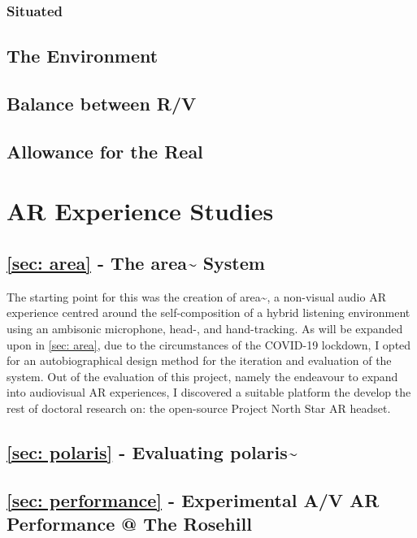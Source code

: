 \subsubsection{Situated}

\subsection{The Environment}
\subsection{Balance between R/V}
\subsection{Allowance for the Real}



\section{AR Experience Studies}
\subsection{\autoref{sec: area} -  The area\textasciitilde{} System}
The starting point for this was the creation of area\textasciitilde{}, a non-visual audio AR experience centred around the self-composition of a hybrid listening environment using an ambisonic microphone, head-, and hand-tracking. As will be expanded upon in \autoref{sec: area}, due to the circumstances of the COVID-19 lockdown, I opted for an autobiographical design method for the iteration and evaluation of the system. Out of the evaluation of this project, namely the endeavour to expand into audiovisual AR experiences, I discovered a suitable platform the develop the rest of doctoral research on: the open-source Project North Star AR headset.

\subsection{\autoref{sec: polaris} - Evaluating polaris\textasciitilde{}}
\subsection{\autoref{sec: performance} - Experimental A/V AR Performance @ The Rosehill}

